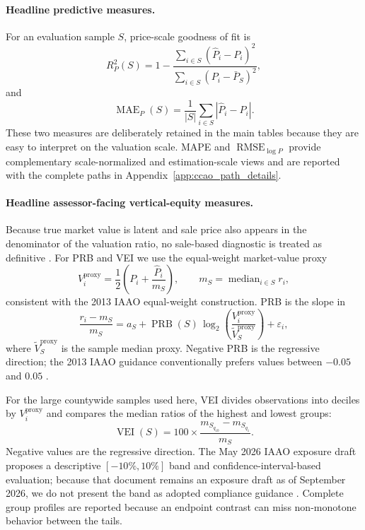 \documentclass[10pt]{article}
\theoremstyle{definition}
\newcommand{\1}{\mathbf{1}}
\begin{document}
\paragraph{Headline predictive measures.}
For an evaluation sample $S$, price-scale goodness of fit is
\[
R^2_P(S)=1-\frac{\sum_{i\in S}(\widehat P_i-P_i)^2}{\sum_{i\in S}(P_i-\bar P_S)^2},
\]
and
\[
\operatorname{MAE}_P(S)=\frac{1}{|S|}\sum_{i\in S}|\widehat P_i-P_i|.
\]
These two measures are deliberately retained in the main tables because they are easy to interpret on the valuation scale. MAPE and $\operatorname{RMSE}_{\log P}$ provide complementary scale-normalized and estimation-scale views and are reported with the complete paths in Appendix~\ref{app:ccao_path_details}.

\paragraph{Headline assessor-facing vertical-equity measures.}
Because true market value is latent and sale price also appears in the denominator of the valuation ratio, no sale-based diagnostic is treated as definitive \cite{IAAO2013Ratio,IAAO2023VerticalReview,McMillenSingh2023,IAAO2026ExposureRatio}. For PRB and VEI we use the equal-weight market-value proxy
\begin{equation}
\label{eq:market_value_proxy}
V_i^{\mathrm{proxy}}
=
\frac{1}{2}\left(P_i+\frac{\widehat P_i}{m_S}\right),
\qquad
m_S=\operatorname{median}_{i\in S} r_i,
\end{equation}
consistent with the 2013 IAAO equal-weight construction. PRB is the slope in
\begin{equation}
\label{eq:prb}
\frac{r_i-m_S}{m_S}
=
a_S+\operatorname{PRB}(S)\,
\log_2\!\left(\frac{V_i^{\mathrm{proxy}}}{\widetilde V_S^{\mathrm{proxy}}}\right)+\varepsilon_i,
\end{equation}
where $\widetilde V_S^{\mathrm{proxy}}$ is the sample median proxy. Negative PRB is the regressive direction; the 2013 IAAO guidance conventionally prefers values between $-0.05$ and $0.05$ \cite{IAAO2013Ratio}.

For the large countywide samples used here, VEI divides observations into deciles by $V_i^{\mathrm{proxy}}$ and compares the median ratios of the highest and lowest groups:
\begin{equation}
\label{eq:vei}
\operatorname{VEI}(S)=100\times\frac{m_{S_{q_{10}}}-m_{S_{q_1}}}{m_S}.
\end{equation}
Negative values are the regressive direction. The May 2026 IAAO exposure draft proposes a descriptive $[-10\%,10\%]$ band and confidence-interval-based evaluation; because that document remains an exposure draft as of September 2026, we do not present the band as adopted compliance guidance \cite{IAAO2026ExposureRatio}. Complete group profiles are reported because an endpoint contrast can miss non-monotone behavior between the tails.
\end{document}
